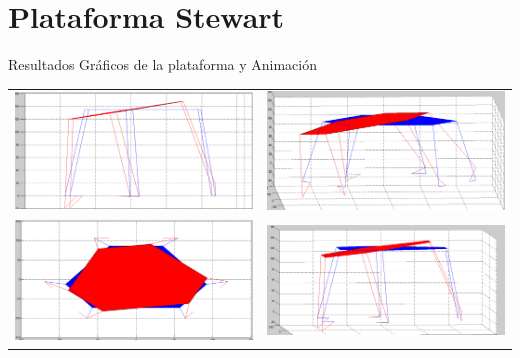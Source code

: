 \documentclass{beamer}
\begin{document}
\section{Plataforma Stewart}
\begin{frame}{Resultados Gráficos de la plataforma y Animación}
\begin{center}
\begin{tabular}{cc}
\includegraphics[scale=0.15]{10grados}&
\includegraphics[scale=0.15]{15grados}\\
\includegraphics[scale=0.15]{rol}&
\includegraphics[scale=0.15]{10gradosotra}
\end{tabular}
\end{center}


\end{frame}
\end{document}
